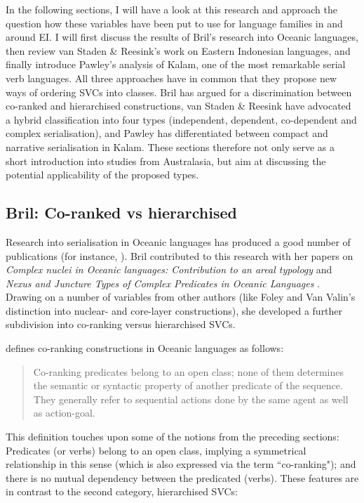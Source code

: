 In the following sections, I will have a look at this research and approach the question how these variables have been put to use for language families in and around EI. I will first discuss the results of Bril's research into Oceanic languages, then review van Staden \& Reesink's work on Eastern Indonesian languages, and finally introduce Pawley's analysis of Kalam, one of the most remarkable serial verb languages. All three approaches have in common that they propose new ways of ordering SVCs into classes. Bril has argued for a discrimination between co-ranked and hierarchised constructions, van Staden \& Reesink have advocated a hybrid classification into four types (independent, dependent, co-dependent and complex serialisation), and Pawley has differentiated between compact and narrative serialisation in Kalam. These sections therefore not only serve as a short introduction into studies from Australasia, but aim at discussing the potential applicability of the proposed types.

\subsection{Bril: Co-ranked vs hierarchised}

Research into serialisation in Oceanic languages has produced a good number of publications (for instance, \citealt{durie1988verb, bradshaw1993subject, crowley1987serial, crowley2002serial}). Bril contributed to this research with her papers on \textit{Complex nuclei in Oceanic languages: Contribution to an areal typology}  \citep{bril2004complex} and \textit{Nexus and Juncture Types of Complex Predicates in Oceanic Languages} \citep{bril2007nexus}. Drawing on a number of variables from other authors (like Foley and Van Valin's distinction into nuclear- and core-layer constructions), she developed a further subdivision into co-ranking versus hierarchised SVCs. 

\citet[269]{bril2007nexus} defines co-ranking constructions in Oceanic languages as follows:

\begin{quote}Co-ranking predicates belong to an open class; none of them determines the semantic or syntactic property of another predicate of the sequence. They generally refer to sequential actions done by the same agent as well as action-goal. \end{quote}

This definition touches upon some of the notions from the preceding sections: Predicates (or verbs) belong to an open class, implying a symmetrical relationship in this sense (which is also expressed via the term ``co-ranking"); and there is no mutual dependency between the predicated (verbs). These features are in contrast to the second category, hierarchised SVCs:


